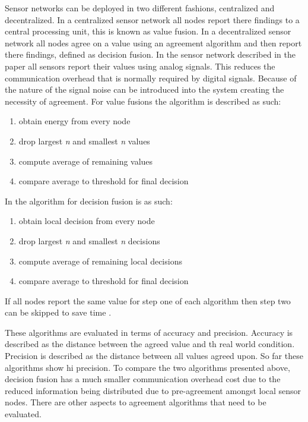 \documentclass[twoside, conference]{IEEEtran}
\begin{document}
Sensor networks can be deployed in two different fashions, centralized and decentralized. In a centralized sensor network all nodes report there findings to a central processing unit, this is known as value fusion. In a decentralized sensor network all nodes agree on a value using an agreement algorithm and then report there findings, defined as decision fusion. In the sensor network described in the paper all sensors report their values using analog signals. This reduces the communication overhead that is normally required by digital signals. Because of the nature of the signal noise can be introduced into the system creating the necessity of agreement. For value fusions the algorithm is described as such:
\begin{enumerate}
	\item obtain energy from every node
	\item drop largest \textit{n} and smallest \textit{n} values
	\item compute average of remaining values
	\item compare average to threshold for final decision
\end{enumerate}
In \cite{clouqueur2004} the algorithm for decision fusion is as such:
\begin{enumerate}
	\item obtain local decision from every node
	\item drop largest \textit{n} and smallest \textit{n} decisions
	\item compute average of remaining local decisions
	\item compare average to threshold for final decision
\end{enumerate}
If all nodes report the same value for step one of each algorithm then step two can be skipped to save time \cite{clouqueur2004}.

These algorithms are evaluated in terms of accuracy and precision. Accuracy is described as the distance between the agreed value and th real world condition. Precision is described as the distance between all values agreed upon. So far these algorithms show hi precision. To compare the two algorithms presented above, decision fusion has a much smaller communication overhead cost due to the reduced information being distributed due to pre-agreement amongst local sensor nodes. There are other aspects to agreement algorithms that need to be evaluated. 
\end{document}
